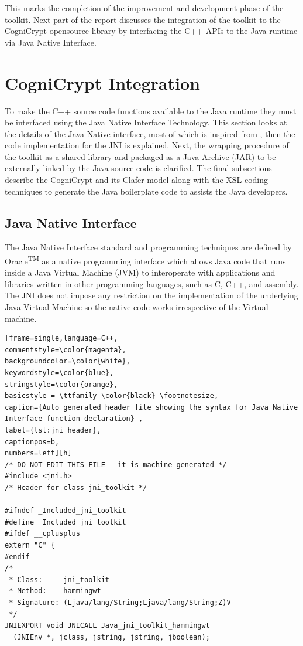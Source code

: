 This marks the completion of the improvement and development phase of the toolkit. Next part of the report discusses the integration of the toolkit to the CogniCrypt opensource library by interfacing the C++ APIs to the Java runtime via Java Native Interface.

\section{CogniCrypt Integration}

To make the C++ source code functions available to the Java runtime they must be interfaced using the Java Native Interface Technology. This section looks at the details of the Java Native interface, most of which is inspired from \cite{jni}, then the code implementation for the JNI is explained. Next, the wrapping procedure of the toolkit as a shared library and packaged as a Java Archive (JAR) to be externally linked by the Java source code is clarified. The final subsections describe the
CogniCrypt and its Clafer model
along with the XSL coding techniques to generate the Java boilerplate code to assists the Java developers.\\

\subsection{Java Native Interface}
The Java Native Interface standard and programming techniques are defined by Oracle\textsuperscript{TM} as a native programming interface which allows Java code that runs inside a Java Virtual Machine (JVM) to interoperate with applications and libraries written in other programming languages, such as C, C++, and assembly. The JNI does not impose any restriction on the implementation of the underlying Java Virtual Machine so the native code works irrespective of the Virtual machine.\\

\begin{lstlisting}[frame=single,language=C++,
commentstyle=\color{magenta},
backgroundcolor=\color{white},
keywordstyle=\color{blue},
stringstyle=\color{orange},
basicstyle = \ttfamily \color{black} \footnotesize,
caption={Auto generated header file showing the syntax for Java Native Interface function declaration} ,
label={lst:jni_header},
captionpos=b,
numbers=left][h]
/* DO NOT EDIT THIS FILE - it is machine generated */
#include <jni.h>
/* Header for class jni_toolkit */

#ifndef _Included_jni_toolkit
#define _Included_jni_toolkit
#ifdef __cplusplus
extern "C" {
#endif
/*
 * Class:     jni_toolkit
 * Method:    hammingwt
 * Signature: (Ljava/lang/String;Ljava/lang/String;Z)V
 */
JNIEXPORT void JNICALL Java_jni_toolkit_hammingwt
  (JNIEnv *, jclass, jstring, jstring, jboolean);
\end{lstlisting}
\vspace*{1\baselineskip}

